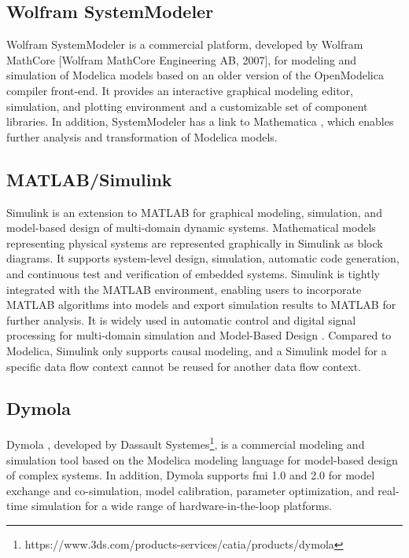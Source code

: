 \subsection{Wolfram SystemModeler}
\label{sec:wolfram}

Wolfram SystemModeler \cite{wolfram, wolframmats, wolframpeter} is a commercial platform, developed by Wolfram MathCore [Wolfram MathCore Engineering AB, 2007], for modeling and simulation of Modelica models based on an older version of the OpenModelica compiler front-end. It provides an interactive graphical modeling editor, simulation, and plotting environment and a customizable set of component libraries. In addition, SystemModeler has a link to Mathematica \cite{mathematica}, which enables further analysis and transformation of Modelica models.

\subsection{MATLAB/Simulink}
\label{sec:simulink}

Simulink \cite{simulink} is an extension to MATLAB for graphical modeling, simulation, and model-based design of multi-domain dynamic systems. Mathematical models representing physical systems are represented graphically in Simulink as block diagrams. It supports system-level design, simulation, automatic code generation, and continuous test and verification of embedded systems.
Simulink is tightly integrated with the MATLAB environment, enabling users to incorporate MATLAB algorithms into models and export simulation results to MATLAB for further analysis. It is widely used in automatic control and digital signal processing for multi-domain simulation and Model-Based Design \cite{simulinkchristian,simulinkreedy}. Compared to Modelica, Simulink only supports causal modeling, and a Simulink model for a specific data flow context cannot be reused for another data flow context.

\subsection{Dymola}
\label{sec:dymola}

Dymola \cite{dymola,dymoladag}, developed by Dassault Systemes\footnote{https://www.3ds.com/products-services/catia/products/dymola}, is a commercial modeling and simulation tool based on the Modelica modeling language for model-based design of complex systems. In addition, Dymola supports \acrshort{fmi} 1.0 and 2.0 for model exchange and co-simulation, model calibration, parameter optimization, and real-time simulation for a wide range of hardware-in-the-loop platforms.

